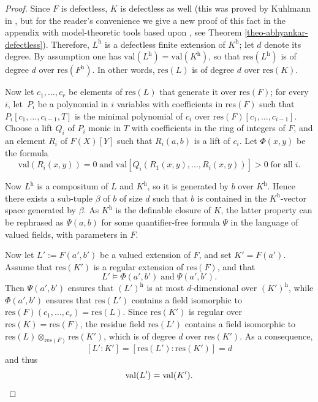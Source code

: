 \documentclass[JEP,XML,SOM,Unicode,ThmDefs,NoEqCountersInSection,published]{cedram}
\newcommand{\val}{\mathrm{val}}
\theoremstyle{plain}
\theoremstyle{definition}
\begin{document}
\begin{proof}
Since $F$ is defectless, $K$ is defectless as well (this was proved
by Kuhlmann in \cite{kuhl}, but for the reader's convenience we give a new proof of this fact in the appendix
with model-theoretic tools based upon \cite{HL}, see Theorem \ref{theo-abhyankar-defectless}).
Therefore, $L^{\mathrm h}$ is a defectless finite extension of $K^{\mathrm h}$; let
$d$ denote its degree. By assumption one has $\val (L^{\mathrm h})=\val(K^{\mathrm h})$, so that $\mathrm{res}(L^{\mathrm h})$
is of degree $d$ over $\mathrm{res}(F^{\mathrm h})$. In other words, $\mathrm{res}(L)$ is of degree $d$ over $\mathrm{res}(K)$.

Now let $c_1,\ldots, c_r$ be elements of $\mathrm{res}(L)$ that generate it over $\mathrm{res}(F)$; for \hbox{every $i$}, let~$P_i$ be a polynomial in $i$ variables with coefficients in $\mathrm{res}(F)$ such that $P_i[c_1,\ldots, c_{i-1}, T]$ is the minimal polynomial of $c_i$ over $\mathrm{res}(F)[c_1,\ldots, c_{i-1}]$.
Choose a lift $Q_i$ of $P_i$ monic in $T$ with coefficients in the ring of integers of $F$, and an element $R_i$ of $F(X)[Y]$ such that $R_i (a, b)$ is a lift of $c_i$.
Let $\Phi(x,y)$ be the formula
\[\val (R_i(x,y))=0\;\text{and}\;\val [Q_i(R_1(x,y),\ldots, R_i(x,y))]>0\;\text{for all}\;i.\]

Now $L^{\mathrm h}$ is a compositum of $L$ and $K^{\mathrm h}$, so it is generated by $b$ over $K^{\mathrm h}$.
Hence there exists a sub-tuple $\beta$ of $b$ of size $d$ such that $b$ is contained in the $K^{\mathrm h}$-vector space generated by
$\beta$. As $K^{\mathrm h}$ is the definable closure of $K$, the latter property can be rephrased as $\Psi(a,b)$ for some quantifier-free formula $\Psi$ in the language of valued fields, with parameters in $F$.

Now let $L':=F(a',b')$ be a valued extension of $F$,
and set $K'=F(a')$. Assume that $\mathrm{res}(K')$ is
a regular extension of $\mathrm{res}(F)$, and that
\[L'\models \Phi(a',b')\;\text{and}\;\Psi(a',b').\] Then $\Psi(a',b')$
ensures that $(L')^{\mathrm h}$ is at most $d$-dimensional over $(K')^{\mathrm h}$,
while $\Phi(a',b')$ ensures that $\mathrm{res}(L')$ contains a field isomorphic to
$\mathrm{res}(F)(c_1,\ldots, c_r)=\mathrm{res}(L)$. Since $\mathrm{res}(K')$
is regular over $\mathrm{res}(K)=\mathrm{res}(F)$, the residue field $\mathrm{res}(L')$ contains a
field isomorphic to $\mathrm{res}(L)\otimes_{\mathrm{res}(F)}\mathrm{res}(K')$,
which is of degree $d$ over $\mathrm{res}(K')$.
As a consequence,
\[[L':K']=[\mathrm{res}(L'):\mathrm{res}(K')]=d\]
and thus
\[\val(L')=\val(K').\qedhere\]
\end{proof}
\end{document}
